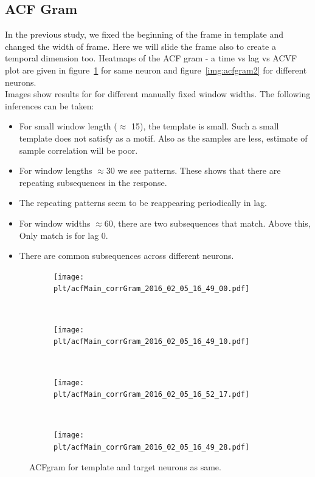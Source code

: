\documentclass[11pt,paper=a4,answers]{exam}
\newcommand{\plt}{../../plots}
\begin{document}
\FloatBarrier
\subsection{ACF Gram} %
\label{sub:acf_gram}
In the previous study, we fixed the beginning of the frame in template and changed the width of frame. Here we will slide the frame also to create a temporal dimension too. Heatmaps of the ACF gram - a time vs lag vs ACVF plot are given in figure~\ref{img:acfgram1} for same neuron and figure~\ref{img:acfgram2} for different neurons.\\
Images show results for for different manually fixed window widths. The following inferences can be taken:
\begin{itemize}
    \item For small window length ($\approx$ 15), the template is small. Such a small template does not satisfy as a motif. Also as the samples are less, estimate of sample correlation will be poor.
    \item For window lengths $\approx 30$ we see patterns. These shows that there are repeating subsequences in the response.
    \item The repeating patterns seem to be reappearing periodically in lag.
    \item For window widths $\approx 60$, there are two subsequences that match. Above this, Only match is for lag 0.
    \item There are common subsequences across different neurons.
\end{itemize}
\begin{figure}
    \centering
    \begin{subfigure}[b]{.48\textwidth}
        \centering
        \texttt{[image: \\plt/acfMain\_corrGram\_2016\_02\_05\_16\_49\_00.pdf]}
    \end{subfigure}
    ~
    \begin{subfigure}[b]{.48\textwidth}
        \centering
        \texttt{[image: \\plt/acfMain\_corrGram\_2016\_02\_05\_16\_49\_10.pdf]}
    \end{subfigure}
    \\
    \begin{subfigure}[b]{.48\textwidth}
        \centering
        \texttt{[image: \\plt/acfMain\_corrGram\_2016\_02\_05\_16\_52\_17.pdf]}
    \end{subfigure}
    ~
    \begin{subfigure}[b]{.48\textwidth}
        \centering
        \texttt{[image: \\plt/acfMain\_corrGram\_2016\_02\_05\_16\_49\_28.pdf]}
    \end{subfigure}
    \caption{ACFgram for template and target neurons as same.}
    \label{img:acfgram1}
\end{figure}
\end{document}
